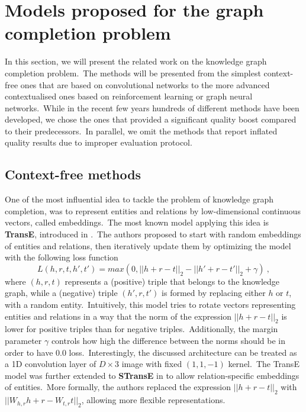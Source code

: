 \documentclass[longabstract, english, mgr]{iithesis}
\theoremstyle{default_theorem_style}\newtheorem{theorem}{Theorem}
\theoremstyle{default_theorem_style}\newtheorem{definition}{Definition}
\begin{document}
\section{Models proposed for the graph completion problem}\label{sec:background_models}

In this section, we will present the related work on the knowledge graph completion problem.\ The methods will be
presented from the simplest context-free ones that are based on convolutional networks to the more advanced
contextualised ones based on reinforcement learning or graph neural networks.\ While in the recent few years hundreds of
different methods have been developed, we chose the ones that provided a significant quality boost compared to their
predecessors.\ In parallel, we omit the methods that report inflated quality results due to improper evaluation
protocol.

\subsection{Context-free methods}

One of the most influential idea to tackle the problem of knowledge graph completion, was to represent entities and
relations by low-dimensional continuous vectors, called embeddings.\ The most known model applying this idea is
\textbf{TransE}, introduced in \cite{transe_model}.\ The authors proposed to
start with random embeddings of entities and relations, then iteratively update them by optimizing the model
with the following loss function
$$
L(h, r, t, h', t') = max(0, ||h + r - t||_2 - ||h' + r - t'||_2 + \gamma)\ ,
$$
where $(h, r, t)$ represents a (positive) triple that belongs to the knowledge graph, while a (negative) triple
$(h', r, t')$ is formed by replacing either $h$ or $t$, with a random entity.\ Intuitively, this model tries to
rotate vectors representing entities and relations in a way that the norm of the expression $||h + r - t||_2$ is lower
for positive triples than for negative triples.\ Additionally, the margin parameter $\gamma$ controls how high the
difference between the norms should be in order to have $0.0$ loss.\ Interestingly, the discussed architecture can be
treated as a 1D convolution layer of $D \times 3$ image with fixed $(1, 1, -1)$ kernel.\ The TransE model was
further extended to \textbf{STransE} in \cite{stranse_model} to allow relation-specific embeddings of entities.\ More
formally, the authors replaced the expression $||h + r - t||_2$ with $||W_{h,r} h + r - W_{t,r} t||_2$, allowing more
flexible representations.\newline
\end{document}
